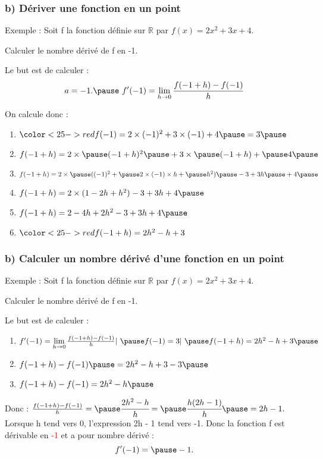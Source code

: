 \documentclass[t]{beamer}
\begin{document}
\begin{frame}[label=pagebanale]
\frametitle{b) Dériver une fonction en un point}
\pause
\begin{exampleblock}{Exemple :}
\pause
Soit f la fonction définie sur $\mathbb{R}$ par $f(x) = 2x^2 + 3x + 4.$

\pause
Calculer le nombre dérivé de f en -1.
\pause
\end{exampleblock}
\begin{block}{Le but est de calculer :}
\pause
\[  a = -1. \pause \
f'(-1) =\lim\limits_{h \rightarrow 0}\frac{f(-1+h) - f(-1)}{h}\]
\pause
\end{block}
\begin{block}{On calcule donc :}
\pause
\begin{enumerate}[]
\item \(\color<25->{red}{f(-1) = 2 \times (-1)^2 + 3 \times (-1) + 4 \pause = 3} \pause \)
\item \(f(-1+ h) = 2 \times \pause (-1+h)^2 \pause + 3 \times \pause (-1+h) + \pause 4 \pause \)
\item \(f(-1+ h) = 2 \times \pause ((-1)^2 + \pause 2 \times (-1) \times h + \pause  h^2) \pause - 3 + 3h \pause + 4 \pause \)
\item \( f(-1+ h) = 2 \times (1 - 2h + h^2) -3 +3h + 4 \pause \)
\item \(f(-1+h) = 2 - 4h + 2h^2 -3 + 3h + 4 \pause \)
\item \(\color<25->{red}{f(-1+ h) = 2h^2 - h + 3}\)
\end{enumerate}
\end{block}
\end{frame}

\begin{frame}[label=pagebanale]
\frametitle{b) Calculer un nombre dérivé d'une fonction en un point}
\pause
\begin{exampleblock}{Exemple :}
\pause
Soit f la fonction définie sur $\mathbb{R}$ par $f(x) = 2x^2 + 3x + 4.$

\pause
Calculer le nombre dérivé de f en -1.
\pause
\end{exampleblock}
\begin{block}{Le but est de calculer :}
\pause
\begin{enumerate}[]
\item \textcolor{green}{\(f'(-1) = \lim\limits_{h \rightarrow 0}\frac{f(-1+h) - f(-1)}{h}  |  \ \pause f(-1) = 3  |   \ \pause f(-1+ h) = 2h^2 - h + 3 \pause\)}
\item \(f(-1+ h) - f(-1) \pause = 2h^2 -h + 3 - 3 \pause \)
\item \(f(-1+ h) - f(-1)  = 2h^2 -h \pause \)
\end{enumerate}
\pause
Donc : 
\( \frac{f(-1+ h) - f(-1)}{h} = \pause \cfrac{ 2h^2-h}{h} = \pause \cfrac{ h(2h-1)}{h} \pause = 2h - 1.\) 
\pause
Lorsque h tend vers 0, \pause l'expression 2h - 1 tend vers -1. \pause
Donc la fonction f est dérivable en \textcolor{red}{-1} \pause et a pour nombre dérivé : \pause
\textcolor{red}{\[f'(-1) = \pause -1.\]}
\end{block}
\end{frame}
\end{document}
